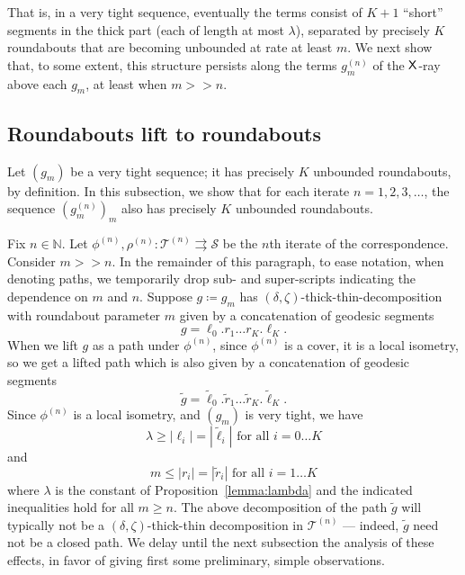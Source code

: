 \documentclass{amsart}
\newcommand\N{{\mathbb{N}}}
\theoremstyle{definition}
\theoremstyle{remark}
\newcommand{\sfX}{{\sf X}}
\newcommand{\cT}{\mathcal{T}}
\newcommand{\cS}{\mathcal{S}}
\renewcommand\gg{>\!\!>}
\begin{document}
That is, in a very tight sequence, eventually the terms consist of $K+1$ ``short'' segments in the thick part (each of length at most $\lambda$), separated by precisely $K$ roundabouts that are becoming unbounded at rate at least $m$. We next show that, to some extent, this structure persists along the terms $g_m^{(n)}$ of the $\sfX$-ray above each $g_m$, at least when $m\gg n$.

\subsection{Roundabouts lift to roundabouts}\label{subsecn:liftingunder}
Let $(g_m)$ be a very tight sequence; it has precisely $K$ unbounded roundabouts, by definition.  In this subsection, we show that for each iterate $n=1, 2, 3, \ldots$, the sequence $(g_m^{(n)})_m$ also has precisely $K$ unbounded roundabouts.

Fix $n\in \N$. Let $\phi^{(n)}, \rho^{(n)}\colon \cT^{(n)} \rightrightarrows\cS$ be the $n$th iterate of the correspondence.  Consider $m\gg n$.  In the remainder of this paragraph, to ease notation, when denoting paths, we temporarily drop sub- and super-scripts indicating the dependence on $m$ and $n$.  Suppose $g\coloneqq g_m$ has $(\delta, \zeta)$-thick-thin-decomposition with roundabout parameter $m$ given by a concatenation of geodesic segments 
 \[ g=\ell_0.r_1\ldots r_K . \ell_K.\]
 When we lift $g$ as a path under $\phi^{(n)}$, since  $\phi^{(n)}$ is a cover, it is a local isometry, so we get a lifted path which is also given by a concatenation of geodesic segments
 \[ \tilde{g} =\tilde{\ell}_0 . \tilde{r}_1\ldots \tilde{r}_K . \tilde{\ell}_K.\]
 Since $\phi^{(n)}$ is a local isometry, and $(g_m)$ is very tight, we have 
 \[ \lambda \geq |\ell_i|=|\tilde{\ell}_i|\text{ for all } i=0\ldots K\]
 and
 \[ m \leq |r_i|=|\tilde{r}_i|\text{ for all } i=1\ldots K\]
 where $\lambda$ is the constant of Proposition~\ref{lemma:lambda} and the indicated inequalities hold for all $m\geq n$. The above decomposition of the path $\tilde{g}$ will typically  not be a $(\delta, \zeta)$-thick-thin decomposition in $\cT^{(n)}$ --- indeed, $\tilde{g}$ need not be a closed path.  We delay until the next subsection the analysis of these effects, in favor of giving first some preliminary, simple observations.  
 
\end{document}
